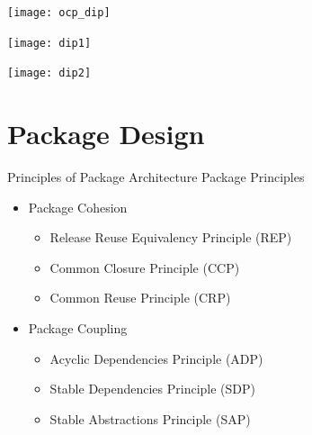 \documentclass[xcolor=svgnames]{beamer}
\begin{document}
\begin{frame}{\subsecname}
    \centering
    \texttt{[image: ocp\_dip]}
\end{frame}


\begin{frame}{\subsecname}
    \centering
    \texttt{[image: dip1]}
\end{frame}


\begin{frame}{\subsecname}
    \centering
    \texttt{[image: dip2]}
\end{frame}


\section{Package Design}


\begin{frame}{Principles of Package Architecture}
    Package Principles
    \begin{itemize}
        \item<2-> Package Cohesion
            \begin{itemize}
                \item<4-> Release Reuse Equivalency Principle (REP)
                \item<5-> Common Closure Principle (CCP)
                \item<6-> Common Reuse Principle (CRP)
            \end{itemize}
        \item<3-> Package Coupling
            \begin{itemize}
                \item<7-> Acyclic Dependencies Principle (ADP)
                \item<8-> Stable Dependencies Principle (SDP)
                \item<9-> Stable Abstractions Principle (SAP)
            \end{itemize}
    \end{itemize}
\end{frame}
\end{document}
